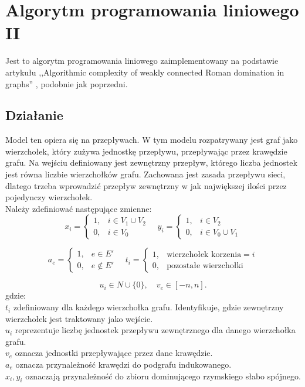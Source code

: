 \FloatBarrier
\section{Algorytm programowania liniowego II}
Jest to algorytm programowania liniowego zaimplementowany na podstawie artykułu ,,Algorithmic complexity of weakly connected Roman domination in graphs'' \cite{ILP}, podobnie jak poprzedni.
\subsection{Działanie}
Model ten opiera się na przepływach. W tym modelu rozpatrywany jest graf jako wierzchołek, który zużywa jednostkę przepływu, przepływając przez krawędzie grafu. Na wejściu definiowany jest zewnętrzny przepływ, którego liczba jednostek jest równa liczbie wierzchołków grafu. Zachowana jest zasada przepływu sieci, dlatego trzeba wprowadzić przepływ zewnętrzny w jak największej ilości przez pojedynczy wierzchołek.\\
Należy zdefiniować następujące zmienne:
\[
x_i =
\begin{cases}
1, & i \in V_1 \cup V_2 \\
0, & i \in V_0
\end{cases}
\quad
y_i =
\begin{cases}
1, & i \in V_2 \\
0, & i \in V_0 \cup V_1
\end{cases}
\]

\[
a_e =
\begin{cases}
1, & e \in E' \\
0, & e \notin E'
\end{cases}
\quad
t_i =
\begin{cases}
1, & \text{wierzchołek korzenia} = i \\
0, & \text{pozostałe wierzchołki}
\end{cases}
\]

\[
u_i \in N \cup \{0\}, \quad v_e \in [-n, n].
\]
gdzie:\\
$t_i$ zdefiniowany dla każdego wierzchołka grafu. Identyfikuje, gdzie zewnętrzny wierzchołek jest traktowany jako wejście. \\
$u_i$ reprezentuje liczbę jednostek przepływu zewnętrznego dla danego wierzchołka grafu.\\
$v_e$ oznacza jednostki przepływające przez dane krawędzie.\\
$a_e$ oznacza przynależność krawędzi do podgrafu indukowanego.\\
$x_i, y_i$ oznaczają przynależność do zbioru dominującego rzymskiego słabo spójnego.

